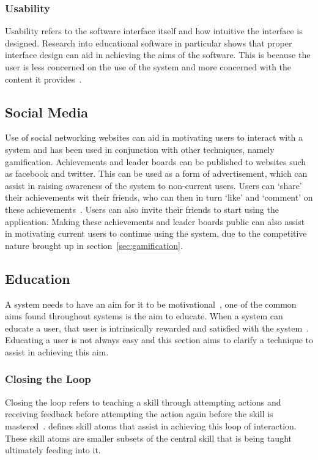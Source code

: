 \documentclass[a4paper,12pt]{article}
\begin{document}
\subsubsection{Usability}
Usability refers to the software interface itself and how intuitive the interface is designed.
Research into educational software in particular shows that proper interface design can aid in achieving the aims of the software. This is because the user is less concerned on the use of the system and more concerned with the content it provides~\citep{472682,5716746,enhancing-learnability}.

\subsection{Social Media}\label{sec:social-media}
Use of social networking  websites can aid in motivating users to interact with a system and has been used in conjunction with other techniques, namely gamification.
Achievements and leader boards can be published to websites such as facebook and twitter. 
This can be used as a form of advertisement, which can assist in raising awareness of the system to non-current users. Users can `share' their achievements wit their friends, who can then in turn `like' and `comment' on these achievements~\citep{6567325}. 
Users can also invite their friends to start using the application.
Making these achievements and leader boards public can also assist in motivating current users to continue using the system, due to the competitive nature brought up in section~\ref{sec:gamification}.

\subsection{Education}
A system needs to have an aim for it to be motivational~\citep{bread-and-games,deci_extrinsic_2001,addition-to-creation}, one of the common aims found throughout systems is the aim to educate. When a system can educate a user, that user is intrinsically rewarded and satisfied with the system~\citep{bread-and-games}.
Educating a user is not always easy and this section aims to clarify a technique to assist in achieving this aim.

\subsubsection{Closing the Loop}
Closing the loop refers to teaching a skill through attempting actions and receiving feedback before attempting the action again before the skill is mastered~\citep{applications-as-stories,virtual-reality,Skill-atoms}. 
\citet{Skill-atoms} defines skill atoms that assist in achieving this loop of interaction. 
These skill atoms are smaller subsets of the central skill that is being taught ultimately feeding into it.
\end{document}
